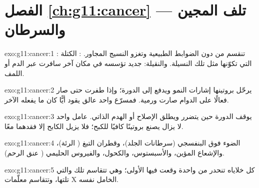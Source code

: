 \section*{الفصل \ref{ch:g11:cancer} --- تلف المجين والسرطان}

\begin{solution}{exo:g11:cancer:1}
:  تنقسم من دون الضوابط الطبيعية وتغزو النسيج المجاور.
: الكتلة التي تكوّنها مثل تلك النسيلة. والنقيلة:  جديد تؤسسه
في مكان آخر  سافرت عبر الدم أو اللمف.
\end{solution}

\begin{solution}{exo:g11:cancer:2}
 يرحّل بروتينها إشارات النمو ويدفع  إلى الدورة؛ وإذا طفرت
حتى صار  فعالًا على الدوام صارت  ورمية. فمسرّع واحد عالق
يقود  أيًّا كان ما يفعله  الآخر.
\end{solution}

\begin{solution}{exo:g11:cancer:3}
يوقف الدورة حين يتضرر  ويطلق الإصلاح أو الهدم الذاتي.  عامل
واحد لا يزال يصنع بروتينًا كافيًا للكبح؛ فلا يزيل الكابح إلا فقدهما
معًا.
\end{solution}

\begin{solution}{exo:g11:cancer:4}
الضوء فوق البنفسجي (سرطانات الجلد)، وقطران التبغ ( الرئة)،
والإشعاع المؤين، والأسبستوس، والكحول، والفيروس الحليمي ( عنق
الرحم).
\end{solution}

\begin{solution}{exo:g11:cancer:5}
كل خلاياه تنحدر من  واحدة وقعت فيها  الأولى؛ وهي تتقاسم تلك
 والتي تلتها، وتتقاسم معلّمات  X الخامل نفسه.
\end{solution}

